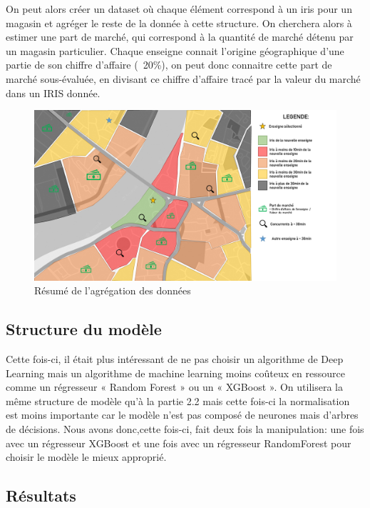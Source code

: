 On peut alors créer un dataset où chaque élément correspond à un iris pour un magasin et agréger le reste de la donnée à cette structure. On cherchera alors à estimer une part de marché, qui correspond à la quantité de marché détenu par un magasin particulier. Chaque enseigne connait l'origine géographique d'une partie de son chiffre d'affaire (~20\%), on peut donc connaitre cette part de marché sous-évaluée, en divisant ce chiffre d'affaire tracé par la valeur du marché dans un IRIS donnée.

\begin{figure}[H]
    \centering
    \includegraphics[width=\linewidth]{images/graphs/data_ca.png}
    \captionsetup{justification=centering}
    \caption{Résumé de l'agrégation des données}
    \label{fig:data_ca}
\end{figure}

\subsection{Structure du modèle}

Cette fois-ci, il était plus intéressant de ne pas choisir un algorithme de Deep Learning mais un algorithme de machine learning moins coûteux en ressource comme un régresseur « Random Forest » ou un « XGBoost ».
On utilisera la même structure de modèle qu’à la partie 2.2 mais cette fois-ci la normalisation est moins importante car le modèle n’est pas composé de neurones mais d’arbres de décisions.
Nous avons donc,cette fois-ci, fait deux fois la manipulation: une fois avec un régresseur XGBoost et une fois avec  un régresseur RandomForest pour choisir le modèle le mieux approprié.


\subsection{Résultats}

